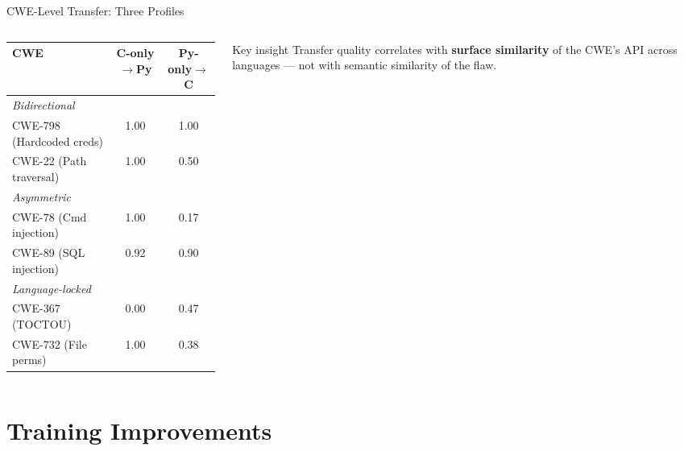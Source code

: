 \documentclass[aspectratio=169]{beamer}
\begin{document}
\begin{frame}{CWE-Level Transfer: Three Profiles}
  \begin{columns}
    \begin{column}{0.55\textwidth}
      \begin{tabular}{lcc}
        \toprule
        CWE & C-only$\to$Py & Py-only$\to$C \\
        \midrule
        \multicolumn{3}{l}{\textit{Bidirectional}} \\
        CWE-798 (Hardcoded creds) & 1.00 & 1.00 \\
        CWE-22 (Path traversal)   & 1.00 & 0.50 \\
        \midrule
        \multicolumn{3}{l}{\textit{Asymmetric}} \\
        CWE-78 (Cmd injection)    & 1.00 & 0.17 \\
        CWE-89 (SQL injection)    & 0.92 & 0.90 \\
        \midrule
        \multicolumn{3}{l}{\textit{Language-locked}} \\
        CWE-367 (TOCTOU)          & 0.00 & 0.47 \\
        CWE-732 (File perms)      & 1.00 & 0.38 \\
        \bottomrule
      \end{tabular}
    \end{column}
    \begin{column}{0.42\textwidth}
      \begin{block}{Key insight}
        Transfer quality correlates with
        \textbf{surface similarity} of the CWE's
        API across languages ---
        not with semantic similarity of the flaw.
      \end{block}
    \end{column}
  \end{columns}
\end{frame}

\section{Training Improvements}
\end{document}
